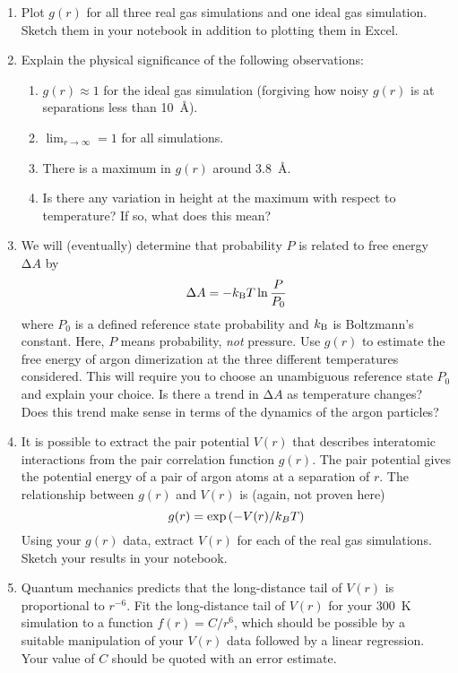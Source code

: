 \documentclass[10pt]{article}
\begin{document}
  \begin{enumerate}
    \item Plot $g(r)$ for all three real gas simulations and one ideal gas simulation.
    Sketch them in your notebook in addition to plotting them in Excel.
    \item Explain the physical significance of the following observations:
      \begin{enumerate}
        \item $g(r) \approx 1$ for the ideal gas simulation (forgiving how noisy $g(r)$ is at separations less than 10~Å).
        \item $\displaystyle \lim_{r \to \infty} = 1$ for all simulations.
        \item There is a maximum in $g(r)$ around 3.8~Å.
        \item Is there any variation in height at the maximum with respect to temperature?
          If so, what does this mean?
      \end{enumerate}
  
    \item We will (eventually) determine that probability $P$ is related to free energy $\increment A$ by
    \[
    \Delta A = -k_\mathrm{B} T \ln \frac{P}{P_0}
    \]
      where $P_0$ is a defined reference state probability and $k_\mathrm{B}$ is Boltzmann's constant.
      Here, $P$ means probability, \emph{not} pressure.
      Use $g(r)$ to estimate the free energy of argon dimerization at the three different temperatures considered.
    This will require you to choose an unambiguous reference state $P_0$ and explain your choice.
      Is there a trend in $\increment A$ as temperature changes?
      Does this trend make sense in terms of the dynamics of the argon particles?


  \item It is possible to extract the pair potential $V(r)$ that describes interatomic interactions from the pair correlation function $g(r)$.
    The pair potential gives the potential energy of a pair of argon atoms at a separation of $r$.
    The relationship between $g(r)$ and $V(r)$ is (again, not proven here)
    \[
      g(r) = \exp\left(-V(r)/k_B T\right)
    \]
    Using your $g(r)$ data, extract $V(r)$ for each of the real gas simulations.
    Sketch your results in your notebook.

  \item Quantum mechanics predicts that the long-distance tail of $V(r)$ is proportional to $r^{-6}$.
    Fit the long-distance tail of $V(r)$ for your 300~K simulation to a function $f(r) = C/r^6$, which should be possible by a suitable manipulation of your $V(r)$ data followed by a linear regression.
      Your value of $C$ should be quoted with an error estimate.


\end{enumerate}
\end{document}
